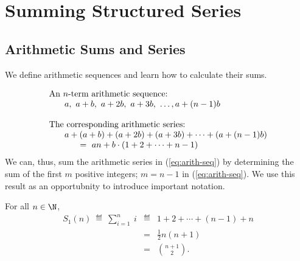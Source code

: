 \documentclass{article}
\begin{document}
\section{Summing Structured Series}
\label{sec:structured-series}

\subsection{Arithmetic Sums and Series}
\label{sec:arithmetic-series}

We define arithmetic sequences and learn how to calculate their sums.

\begin{equation}
\label{eq:arith-seq}
\begin{array}{l}
\mbox{An $n$-term arithmetic sequence:} \\
\hspace*{.25in}a, \ a+b, \ a+2b, \ a+3b, \ \ldots, a+(n-1)b \\
\\
\mbox{The corresponding arithmetic series:} \\
\hspace*{.25in}a + (a+b) + (a+2b) + (a+3b) + \cdots + (a+(n-1)b) \\
\hspace*{.5in} = \
an + b \cdot (1 + 2 + \cdots + n-1)
\end{array}
\end{equation}
We can, thus, sum the arithmetic series in (\ref{eq:arith-seq}) by
determining the sum of the first $m$ positive integers; $m = n-1$ in
(\ref{eq:arith-seq}).  We use this result as an opportubnity to
introduce important notation.


\label{thm:sum-first-integers-Gauss}
For all $n \in \N$,
\begin{eqnarray}
\nonumber
S_1(n) \ \eqdef \ \sum_{i=1}^n \ i
  & \eqdef &
 1 + 2 + \cdots + (n-1) + n \\
\label{eq:sum-1-to-n}
  & = & \frac{1}{2} n (n+1) \\
\nonumber
  & = & {{n+1}  \choose 2}.
\end{eqnarray}
\end{document}
